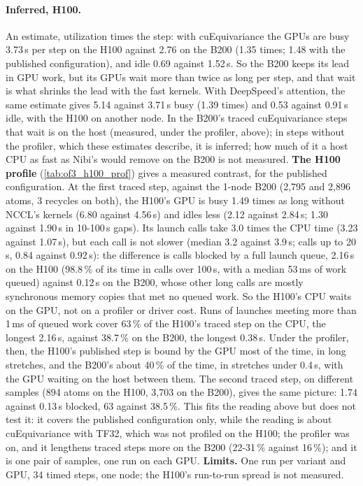 \paragraph{Inferred, H100.} An estimate, utilization times the step: with cuEquivariance the GPUs are busy 3.73\,s per step on the H100 against 2.76 on the B200 (1.35 times; 1.48 with the published configuration), and idle 0.69 against 1.52\,s. So the B200 keeps its lead in GPU work, but its GPUs wait more than twice as long per step, and that wait is what shrinks the lead with the fast kernels. With DeepSpeed's attention, the same estimate gives 5.14 against 3.71\,s busy (1.39 times) and 0.53 against 0.91\,s idle, with the H100 on another node. In the B200's traced cuEquivariance steps that wait is on the host (measured, under the profiler, above); in steps without the profiler, which these estimates describe, it is inferred; how much of it a host CPU as fast as Nibi's would remove on the B200 is not measured. \textbf{The H100 profile} (\cref{tab:of3_h100_prof}) gives a measured contrast, for the published configuration. At the first traced step, against the 1-node B200 (2,795 and 2,896 atoms, 3 recycles on both), the H100's GPU is busy 1.49 times as long without NCCL's kernels (6.80 against 4.56\,s) and idles less (2.12 against 2.84\,s; 1.30 against 1.90\,s in 10-100\,\textmu s gaps). Its launch calls take 3.0 times the CPU time (3.23 against 1.07\,s), but each call is not slower (median 3.2 against 3.9\,\textmu s; calls up to 20\,\textmu s, 0.84 against 0.92\,s): the difference is calls blocked by a full launch queue, 2.16\,s on the H100 (98.8\,\% of its time in calls over 100\,\textmu s, with a median 53\,ms of work queued) against 0.12\,s on the B200, whose other long calls are mostly synchronous memory copies that met no queued work. So the H100's CPU waits on the GPU, not on a profiler or driver cost. Runs of launches meeting more than 1\,ms of queued work cover 63\,\% of the H100's traced step on the CPU, the longest 2.16\,s, against 38.7\,\% on the B200, the longest 0.38\,s. Under the profiler, then, the H100's published step is bound by the GPU most of the time, in long stretches, and the B200's about 40\,\% of the time, in stretches under 0.4\,s, with the GPU waiting on the host between them. The second traced step, on different samples (894 atoms on the H100, 3,703 on the B200), gives the same picture: 1.74 against 0.13\,s blocked, 63 against 38.5\,\%. This fits the reading above but does not test it: it covers the published configuration only, while the reading is about cuEquivariance with TF32, which was not profiled on the H100; the profiler was on, and it lengthens traced steps more on the B200 (22-31\,\% against 16\,\%); and it is one pair of samples, one run on each GPU. \textbf{Limits.} One run per variant and GPU, 34 timed steps, one node; the H100's run-to-run spread is not measured.


